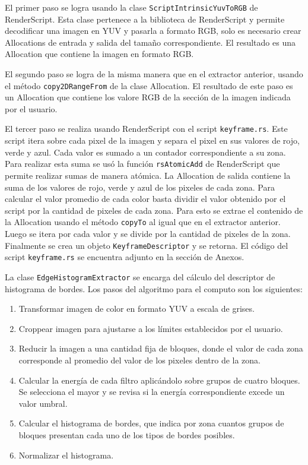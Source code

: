 El primer paso se logra usando la clase \texttt{ScriptIntrinsicYuvToRGB} de RenderScript. Esta clase pertenece a la biblioteca de RenderScript y permite decodificar una imagen en YUV y pasarla a formato RGB, solo es necesario crear Allocations de entrada y salida del tamaño correspondiente. El resultado es una Allocation que contiene la imagen en formato RGB.

El segundo paso se logra de la misma manera que en el extractor anterior, usando el método \texttt{copy2DRangeFrom} de la clase Allocation. El resultado de este paso es un Allocation que contiene los valore RGB de la sección de la imagen indicada por el usuario.

El tercer paso se realiza usando RenderScript con el script \texttt{keyframe.rs}. Este script itera sobre cada pixel de la imagen y separa el pixel en sus valores de rojo, verde y azul. Cada valor es sumado a un contador correspondiente a su zona. Para realizar esta suma se usó la función \texttt{rsAtomicAdd} de RenderScript que permite realizar sumas de manera atómica. La Allocation de salida contiene la suma de los valores de rojo, verde y azul de los pixeles de cada zona. Para calcular el valor promedio de cada color basta dividir el valor obtenido por el script por la cantidad de pixeles de cada zona. Para esto se extrae el contenido de la Allocation usando el método \texttt{copyTo} al igual que en el extractor anterior. Luego se itera por cada valor y se divide por la cantidad de pixeles de la zona. Finalmente se crea un objeto \texttt{KeyframeDescriptor} y se retorna. El código del script \texttt{keyframe.rs} se encuentra adjunto en la sección de Anexos.
 
La clase \texttt{EdgeHistogramExtractor} se encarga del cálculo del descriptor de histograma de bordes. Los pasos del algoritmo para el computo son los siguientes:
\begin{enumerate}
\item Transformar imagen de color en formato YUV a escala de grises.
\item Croppear imagen para ajustarse a los límites establecidos por el usuario.
\item Reducir la imagen a una cantidad fija de bloques, donde el valor de cada zona corresponde al promedio del valor de los pixeles dentro de la zona.
\item Calcular la energía de cada filtro aplicándolo sobre grupos de cuatro bloques. Se selecciona el mayor y se revisa si la energía correspondiente excede un valor umbral.
\item Calcular el histograma de bordes, que indica por zona cuantos grupos de bloques presentan cada uno de los tipos de bordes posibles.
\item Normalizar el histograma.
\end{enumerate}

